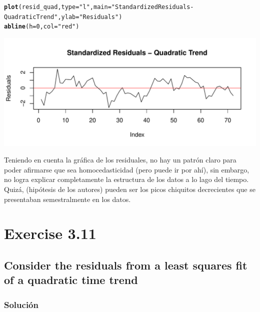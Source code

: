 \documentclass[12pt]{article}\usepackage[]{graphicx}\usepackage[]{xcolor}
\makeatletter
\def\maxwidth{ %
  \ifdim\Gin@nat@width>\linewidth
    \linewidth
  \else
    \Gin@nat@width
  \fi
}
\newcommand{\hlnum}[1]{\textcolor[rgb]{0.686,0.059,0.569}{#1}}%
\newcommand{\hlsng}[1]{\textcolor[rgb]{0.192,0.494,0.8}{#1}}%
\newcommand{\hldef}[1]{\textcolor[rgb]{0.345,0.345,0.345}{#1}}%
\newcommand{\hlkwc}[1]{\textcolor[rgb]{0.333,0.667,0.333}{#1}}%
\newcommand{\hlkwd}[1]{\textcolor[rgb]{0.737,0.353,0.396}{\textbf{#1}}}%
\newenvironment{kframe}{%
 \def\at@end@of@kframe{}%
 \ifinner\ifhmode%
  \def\at@end@of@kframe{\end{minipage}}%
  \begin{minipage}{\columnwidth}%
 \fi\fi%
 \def\FrameCommand##1{\hskip\@totalleftmargin \hskip-\fboxsep
 \colorbox{shadecolor}{##1}\hskip-\fboxsep
     \hskip-\linewidth \hskip-\@totalleftmargin \hskip\columnwidth}%
 \MakeFramed {\advance\hsize-\width
   \@totalleftmargin\z@ \linewidth\hsize
   \@setminipage}}%
 {\par\unskip\endMakeFramed%
 \at@end@of@kframe}
\newenvironment{knitrout}{}{} %
\makeatother
\begin{document}
\begin{knitrout}
\color{fgcolor}\begin{kframe}
\begin{alltt}
\hlkwd{plot}\hldef{(resid_quad,} \hlkwc{type} \hldef{=} \hlsng{"l"}\hldef{,} \hlkwc{main} \hldef{=} \hlsng{"Standardized Residuals - Quadratic Trend"}\hldef{,} \hlkwc{ylab} \hldef{=} \hlsng{"Residuals"}\hldef{)}
\hlkwd{abline}\hldef{(}\hlkwc{h} \hldef{=} \hlnum{0}\hldef{,} \hlkwc{col} \hldef{=} \hlsng{"red"}\hldef{)}
\end{alltt}
\end{kframe}
\includegraphics[width=\maxwidth]{figure/unnamed-chunk-16-1} 
\end{knitrout}

Teniendo en cuenta la gráfica de los residuales, no hay un patrón claro para poder afirmarse que sea homocedasticidad (pero puede ir por ahí), sin embargo, no logra explicar completamente la estructura de los datos a lo lago del tiempo. Quizá, (hipótesis de los autores) pueden ser los picos chiquitos decrecientes que se presentaban semestralmente en los datos.



\section{Exercise 3.11}

\subsection{Consider the residuals from a least squares fit of a quadratic time trend}



\subsubsection{Solución}
\end{document}
